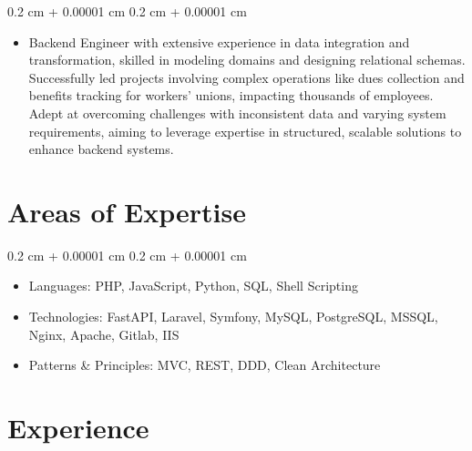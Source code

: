 \documentclass[10pt, letterpaper]{article}
\newenvironment{highlightsforbulletentries}{
    \begin{itemize}[
        topsep=0.10 cm,
        parsep=0.10 cm,
        partopsep=0pt,
        itemsep=0pt,
        leftmargin=10pt
    ]
}{
    \end{itemize}
} %
\newenvironment{onecolentry}{
    \begin{adjustwidth}{
        0.2 cm + 0.00001 cm
    }{
        0.2 cm + 0.00001 cm
    }
}{
    \end{adjustwidth}
} %
\begin{document}
    \begin{onecolentry}
        \begin{highlightsforbulletentries}

        
            \item Backend Engineer with extensive experience in data integration and transformation, skilled in modeling domains and designing relational schemas. Successfully led projects involving complex operations like dues collection and benefits tracking for workers' unions, impacting thousands of employees. Adept at overcoming challenges with inconsistent data and varying system requirements, aiming to leverage expertise in structured, scalable solutions to enhance backend systems.
        

        \end{highlightsforbulletentries}
    \end{onecolentry}

    \section{Areas of Expertise}


        \begin{onecolentry}
            \begin{highlightsforbulletentries}
            
                \item Languages: PHP, JavaScript, Python, SQL, Shell Scripting
            
                \item Technologies: FastAPI, Laravel, Symfony, MySQL, PostgreSQL, MSSQL, Nginx, Apache, Gitlab, IIS
            
                \item Patterns \& Principles: MVC, REST, DDD, Clean Architecture
            
            \end{highlightsforbulletentries}
        \end{onecolentry}
        \vspace{0.2 cm}

    \section{Experience}

        
\end{document}
